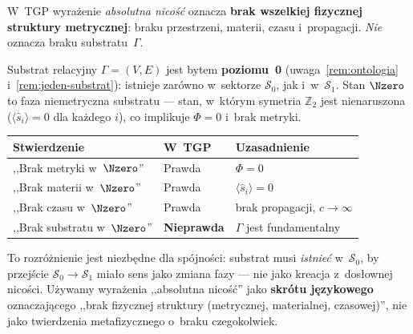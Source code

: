 \begin{remark}%
\label{rem:N0-substrat-precyzacja}
W~TGP wyra\.zenie \emph{absolutna nico\'s\'c} oznacza
\textbf{brak wszelkiej fizycznej struktury metrycznej}:
braku przestrzeni, materii, czasu i~propagacji.
\emph{Nie} oznacza braku substratu~$\Gamma$.

Substrat relacyjny $\Gamma = (V,E)$ jest bytem \textbf{poziomu~0}
(uwaga~\ref{rem:ontologia} i~\ref{rem:jeden-substrat}): istnieje
zar\'owno w~sektorze $\mathcal{S}_0$, jak i~w~$\mathcal{S}_1$.
Stan $\Nzero$ to faza niemetryczna substratu ---
stan, w~kt\'orym symetria $\mathbb{Z}_2$ jest nienaruszona
($\langle\hat{s}_i\rangle = 0$ dla ka\.zdego $i$),
co implikuje $\Phi = 0$ i~brak metryki.

\begin{center}
\small
\begin{tabular}{@{}p{4.5cm}p{2.6cm}p{4.5cm}@{}}
\toprule
\textbf{Stwierdzenie} & \textbf{W~TGP} & \textbf{Uzasadnienie} \\
\midrule
,,Brak metryki w~$\Nzero$'' & Prawda & $\Phi = 0$ \\
,,Brak materii w~$\Nzero$'' & Prawda & $\langle\hat{s}_i\rangle = 0$ \\
,,Brak czasu w~$\Nzero$'' & Prawda & brak propagacji, $c \to \infty$ \\
,,Brak substratu w~$\Nzero$'' & \textbf{Nieprawda} & $\Gamma$ jest fundamentalny \\
\bottomrule
\end{tabular}
\end{center}

To rozr\'o\.znienie jest niezb\k{e}dne dla sp\'ojno\'sci:
substrat musi \emph{istnie\'c} w~$\mathcal{S}_0$, by przej\'scie
$\mathcal{S}_0 \to \mathcal{S}_1$ mia\l{}o sens jako zmiana fazy ---
nie jako kreacja z~dosłownej nico\'sci.
U\.zywamy wyra\.zenia ,,absolutna nico\'s\'c''
jako \textbf{skr\'otu j\k{e}zykowego} oznaczaj\k{a}cego
,,brak fizycznej struktury (metrycznej, materialnej, czasowej)'',
nie jako twierdzenia metafizycznego o~braku czegokolwiek.
\end{remark}

